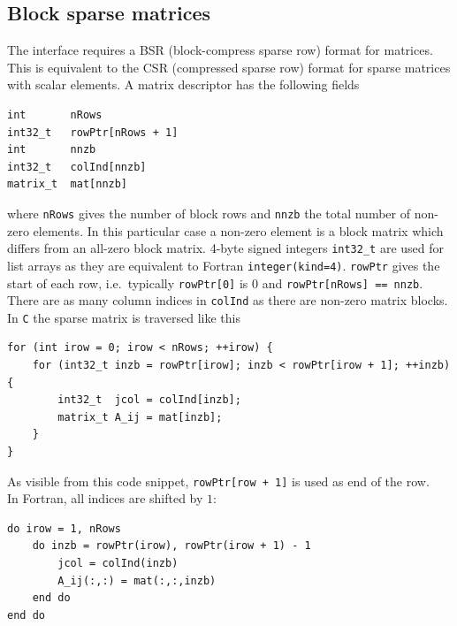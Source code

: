 \documentclass[oribibl]{llncs}
\newcommand{\ttt}[1]{\texttt{#1}}
\begin{document}
\subsection{Block sparse matrices} \label{sec:bsr}
%
The interface requires a BSR (block-compress sparse row) format for matrices.
This is equivalent to the CSR (compressed sparse row) format for sparse matrices with scalar elements.
A matrix descriptor has the following fields
\begin{verbatim}
int       nRows
int32_t   rowPtr[nRows + 1] 
int       nnzb 
int32_t   colInd[nnzb]
matrix_t  mat[nnzb]
\end{verbatim}
where \ttt{nRows} gives the number of block rows and \ttt{nnzb} the total number of non-zero elements.
In this particular case a non-zero element is a block matrix which differs from an all-zero block matrix.
4-byte signed integers \ttt{int32\_t} are used for list arrays as they are equivalent to Fortran \ttt{integer(kind=4)}.
\ttt{rowPtr} gives the start of each row, i.e.~typically \ttt{rowPtr[0]} is $0$ and \ttt{rowPtr[nRows] == nnzb}.
There are as many column indices in \ttt{colInd} as there are non-zero matrix blocks.
In \ttt{C} the sparse matrix is traversed like this
\lstset{language=C}
\begin{lstlisting}
for (int irow = 0; irow < nRows; ++irow) {
  	for (int32_t inzb = rowPtr[irow]; inzb < rowPtr[irow + 1]; ++inzb) {
		int32_t  jcol = colInd[inzb];
		matrix_t A_ij = mat[inzb];
  	}
}
\end{lstlisting}
As visible from this code snippet, \ttt{rowPtr[row + 1]} is used as end of the row.
\\
\noindent
In Fortran, all indices are shifted by $1$:
\lstset{language=Fortran}
\begin{lstlisting}
do irow = 1, nRows
	do inzb = rowPtr(irow), rowPtr(irow + 1) - 1
		jcol = colInd(inzb)
		A_ij(:,:) = mat(:,:,inzb)
	end do
end do
\end{lstlisting}
\end{document}
